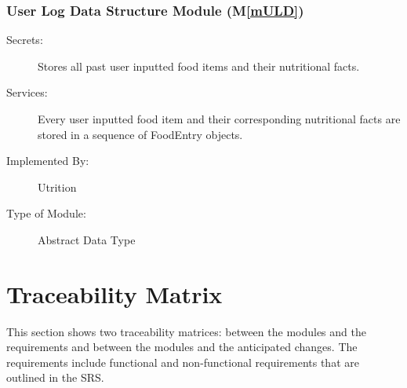 \documentclass[12pt, titlepage]{article}
\newcommand{\mref}[1]{M\ref{#1}}
\begin{document}
\subsubsection{User Log Data Structure Module (\mref{mULD})}

\begin{description}
	\item[Secrets:]Stores all past user inputted food items and their nutritional facts.
	\item[Services:]Every user inputted food item and their corresponding nutritional facts are stored in a sequence of FoodEntry objects.
	\item[Implemented By:] Utrition
	\item[Type of Module:] Abstract Data Type
\end{description}

\section{Traceability Matrix} \label{SecTM}

This section shows two traceability matrices: between the modules and the
requirements and between the modules and the anticipated changes. The requirements include functional and non-functional requirements that are outlined in the SRS.
\end{document}
